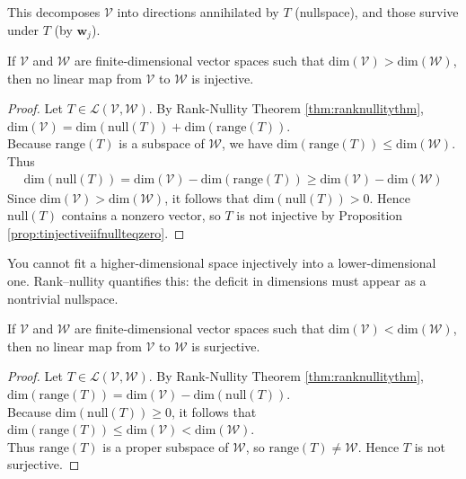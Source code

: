 This decomposes $\mathcal{V}$ into directions annihilated by $T$ (nullspace), and those survive under $T$ (by $\mathbf{w}_j$).

\begin{corollary} If $\mathcal{V}$ and $\mathcal{W}$ are finite-dimensional vector spaces such that $\text{dim}(\mathcal{V}) > \text{dim}(\mathcal{W})$, then no linear map from $\mathcal{V}$ to $\mathcal{W}$ is injective.
\begin{proof} Let $T \in \mathcal{L}(\mathcal{V}, \mathcal{W})$. By Rank-Nullity Theorem \ref{thm:ranknullitythm}, $\text{dim}(\mathcal{V}) = \text{dim}(\text{null}(T)) + \text{dim}(\text{range}(T))$.\\
Because $\text{range}(T)$ is a subspace of $\mathcal{W}$, we have $\text{dim}(\text{range}(T)) \leq \text{dim}(\mathcal{W})$. Thus
\begin{align}
\text{dim}(\text{null}(T)) = \text{dim}(\mathcal{V}) - \text{dim}(\text{range}(T)) \geq \text{dim}(\mathcal{V}) - \text{dim}(\mathcal{W}) \nonumber
\end{align}
Since $\text{dim}(\mathcal{V}) > \text{dim}(\mathcal{W})$, it follows that $\text{dim}(\text{null}(T)) > 0$. Hence $\text{null}(T)$ contains a nonzero vector, so $T$ is not injective by Proposition \ref{prop:tinjectiveiifnullteqzero}.
\end{proof}
\end{corollary}

You cannot fit a higher-dimensional space injectively into a lower-dimensional one. Rank–nullity quantifies this: the deficit in dimensions must appear as a nontrivial nullspace.

\begin{corollary} If $\mathcal{V}$ and $\mathcal{W}$ are finite-dimensional vector spaces such that $\text{dim}(\mathcal{V}) < \text{dim}(\mathcal{W})$, then no linear map from $\mathcal{V}$ to $\mathcal{W}$ is surjective.
\begin{proof} Let $T \in \mathcal{L}(\mathcal{V}, \mathcal{W})$. By Rank-Nullity Theorem \ref{thm:ranknullitythm}, $\text{dim}(\text{range}(T)) = \text{dim}(\mathcal{V}) - \text{dim}(\text{null}(T))$.\\
Because $\text{dim}(\text{null}(T)) \geq 0$, it follows that $\text{dim}(\text{range}(T)) \leq \text{dim}(\mathcal{V}) < \text{dim}(\mathcal{W})$.\\
Thus $\text{range}(T)$ is a proper subspace of $\mathcal{W}$, so $\text{range}(T) \neq \mathcal{W}$. Hence $T$ is not surjective.
\end{proof}
\end{corollary}

